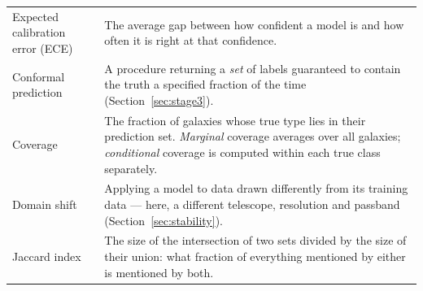 \documentclass[11pt]{article}
\begin{document}
\begin{table}[htbp]
\begin{tabular}{p{}p{}}
Expected calibration error (ECE) & The average gap between how confident a
model is and how often it is right at that confidence. \\
Conformal prediction & A procedure returning a \emph{set} of labels guaranteed
to contain the truth a specified fraction of the time
(Section~\ref{sec:stage3}). \\
Coverage & The fraction of galaxies whose true type lies in their prediction
set. \emph{Marginal} coverage averages over all galaxies; \emph{conditional}
coverage is computed within each true class separately. \\
Domain shift & Applying a model to data drawn differently from its training
data --- here, a different telescope, resolution and passband
(Section~\ref{sec:stability}). \\
Jaccard index & The size of the intersection of two sets divided by the size
of their union: what fraction of everything mentioned by either is mentioned
by both. \\
\bottomrule
\end{tabular}
\end{table}
\end{document}
